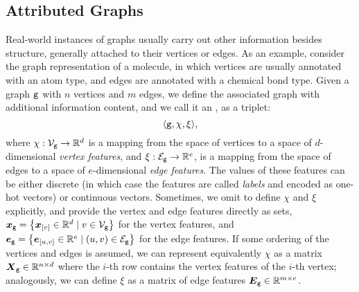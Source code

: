 \subsection{Attributed Graphs} \label{sec:attr-graphs}
Real-world instances of graphs usually carry out other information besides structure, generally attached to their vertices or edges. As an example, consider the graph representation of a molecule, in which vertices are usually annotated with an atom type, and edges are annotated with a chemical bond type. Given a graph $\mathtt{g}$ with $n$ vertices and $m$ edges, we define the associated graph with additional information content, and we call it an , as a triplet:
$$\langle \mathtt{g}, \chi, \xi \rangle,$$
where $\chi: \Nodes_{\Graph{g}}\rightarrow \Real^d$ is a mapping from the space of vertices to a space of $d$-dimensional \emph{vertex features}, and $\xi: \Edges_{\Graph{g}}\rightarrow \Real^{e}$, is a mapping from the space of edges to a space of $e$-dimensional \emph{edge features}. The values of these features can be either discrete (in which case the features are called \emph{labels} and encoded as one-hot vectors) or continuous vectors. Sometimes, we omit to define $\chi$ and $\xi$ explicitly, and provide the vertex and edge features directly as sets, \eg $\Vector{x}_{\Graph{g}}= \Set{\Elem{x}{v} \in \Real^d \mid v \in \Nodes_{\Graph{g}}}$ for the vertex features, and $\Vector{e}_{\Graph{g}}= \Set{\Elem{e}{u,v} \in \Real^e \mid (u, v) \in \Edges_{\Graph{g}}}$ for the edge features.
If some ordering of the vertices and edges is assumed, we can represent equivalently $\chi$ as a matrix $\Matrix{x}_{\Graph{g}}\in \Real^{n \times d}$ where the $i$-th row contains the vertex features of the $i$-th vertex; analogously, we can define $\xi$ as a matrix of edge features $\Matrix{E}_{\Graph{g}}\in \Real^{m \times e}$.

